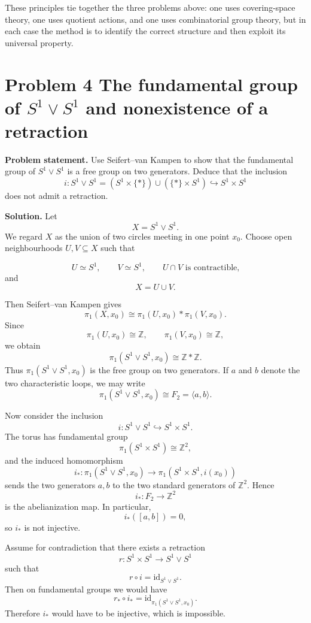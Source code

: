 \documentclass[12pt,a4paper]{article}
\theoremstyle{notespace}
\begin{document}
These principles tie together the three problems above: one uses covering-space theory, one uses quotient actions, and one uses combinatorial group theory, but in each case the method is to identify the correct structure and then exploit its universal property.

\section{Problem 4 The fundamental group of \texorpdfstring{$S^1\vee S^1$}{S1 vee S1} and nonexistence of a retraction}

\textbf{Problem statement.}
Use Seifert--van Kampen to show that the fundamental group of \(S^1\vee S^1\) is a free group on two generators. Deduce that the inclusion
\[
i:S^1\vee S^1=(S^1\times\{*\})\cup(\{*\}\times S^1)\hookrightarrow S^1\times S^1
\]
does not admit a retraction.

\textbf{Solution.}
Let
\[
X=S^1\vee S^1.
\]
We regard \(X\) as the union of two circles meeting in one point \(x_0\). Choose open neighbourhoods \(U,V\subseteq X\) such that

\[
U\simeq S^1,\qquad V\simeq S^1,\qquad U\cap V \text{ is contractible,}
\]
and
\[
X=U\cup V.
\]

Then Seifert--van Kampen gives
\[
\pi_1(X,x_0)\cong \pi_1(U,x_0)*\pi_1(V,x_0).
\]
Since
\[
\pi_1(U,x_0)\cong \mathbb Z,\qquad \pi_1(V,x_0)\cong \mathbb Z,
\]
we obtain
\[
\pi_1(S^1\vee S^1,x_0)\cong \mathbb Z * \mathbb Z.
\]
Thus \(\pi_1(S^1\vee S^1,x_0)\) is the free group on two generators. If \(a\) and \(b\) denote the two characteristic loops, we may write
\[
\pi_1(S^1\vee S^1,x_0)\cong F_2=\langle a,b\rangle.
\]

Now consider the inclusion
\[
i:S^1\vee S^1\hookrightarrow S^1\times S^1.
\]
The torus has fundamental group
\[
\pi_1(S^1\times S^1)\cong \mathbb Z^2,
\]
and the induced homomorphism
\[
i_*:\pi_1(S^1\vee S^1,x_0)\to \pi_1(S^1\times S^1,i(x_0))
\]
sends the two generators \(a,b\) to the two standard generators of \(\mathbb Z^2\). Hence
\[
i_*:F_2\to \mathbb Z^2
\]
is the abelianization map. In particular,
\[
i_*([a,b])=0,
\]
so \(i_*\) is not injective.

Assume for contradiction that there exists a retraction
\[
r:S^1\times S^1\to S^1\vee S^1
\]
such that
\[
r\circ i=\mathrm{id}_{S^1\vee S^1}.
\]
Then on fundamental groups we would have
\[
r_*\circ i_*=\mathrm{id}_{\pi_1(S^1\vee S^1,x_0)}.
\]
Therefore \(i_*\) would have to be injective, which is impossible.
\end{document}
